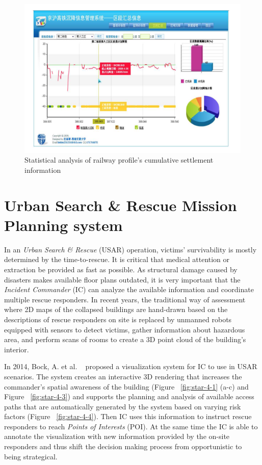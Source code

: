\documentclass{egpubl}
\begin{document}
\begin{figure}[htb]
  \centering
  \includegraphics[width=.95\linewidth]{star-3-2}
  \caption{\label{fig:star-3-2} Statistical analysis of railway profile’s cumulative settlement information}
\end{figure}

\section{Urban Search \& Rescue Mission Planning system}
In an \textit{Urban Search \& Rescue} (USAR) operation, victims' survivability is mostly determined by the time-to-rescue. It is critical that medical attention or extraction be provided as fast as possible. As structural damage caused by disasters makes available floor plans outdated, it is very important that the \textit{Incident Commander} (IC) can analyze the available information and coordinate multiple rescue responders. In recent years, the traditional way of assessment where 2D maps of the collapsed buildings are hand-drawn based on the descriptions of rescue responders on site is replaced by unmanned robots equipped with sensors to detect victims, gather information about hazardous area, and perform scans of rooms to create a 3D point cloud of the building’s interior.

In 2014, Bock, A. et al. ~\cite{bock2014interactive} proposed a visualization system for IC to use in USAR scenarios. The system creates an interactive 3D rendering that increases the commander's spatial awareness of the building (Figure ~\ref{fig:star-4-1} (a-c) and Figure ~\ref{fig:star-4-3}) and supports the planning and analysis of available access paths that are automatically generated by the system based on varying risk factors (Figure ~\ref{fig:star-4-4}). Then IC uses this information to instruct rescue responders to reach \textit{Points of Interests} (POI). At the same time the IC is able to annotate the visualization with new information provided by the on-site responders and thus shift the decision making process from opportunistic to being strategical.
\end{document}
